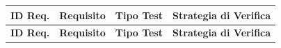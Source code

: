 \documentclass[a4paper,11pt,oneside]{scrartcl}
\begin{document}
\begin{longtable}{|p{1.5cm}|p{5.5cm}|p{1.8cm}|p{5cm}|}
    \hline
    \textbf{ID Req.} & \textbf{Requisito}                                                                                                                                                                                                                                            & \textbf{Tipo Test} & \textbf{Strategia di Verifica}                                                                                                                                                                                                                                             \\
    \hline
    \endfirsthead
    \hline
    \textbf{ID Req.} & \textbf{Requisito}                                                                                                                                                                                                                                            & \textbf{Tipo Test} & \textbf{Strategia di Verifica}                                                                                                                                                                                                                                             \\
    \hline
    \endhead


\end{longtable}
\end{document}

